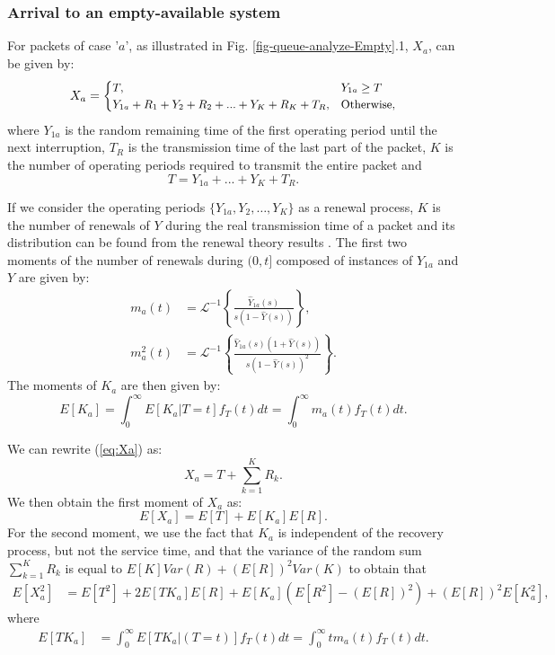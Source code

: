 \documentclass[11pt,journal,oneside,onecolumn,draftclsnofoot]{IEEEtran}
\begin{document}
\subsubsection{Arrival to an empty-available system}
For packets of case '$a$', as illustrated in Fig. \ref{fig-queue-analyze-Empty}.1, $X_a$, can be given by: 
\begin{equation}
\small
X_a=\begin {cases}
T,& Y_{1a}\geq T\\
Y_{1a}+R_1+Y_2+R_2+...+Y_K+R_K+T_R,& \mbox{Otherwise,}
\end{cases}
\label{eq:Xa}
\normalsize
\end{equation}
where $Y_{1a}$ is the random remaining time of the first operating period until the next interruption, $T_R$ is the transmission time of the last part of the packet, $K$ is the number of operating periods required to transmit the entire packet and
\begin{equation}
T=Y_{1a}+...+Y_K+T_R.
\label{eq:renewal-condition}
\end{equation}

If we consider the operating periods $\{Y_{1a},Y_2,\dots,Y_K\}$ as a renewal process, $K$ is the number of renewals of $Y$ during the real transmission time of a packet and  its distribution can be found from the renewal theory results \cite{cox62,ross06}. The first two moments of the number of renewals during $(0,t]$ composed of instances of $Y_{1a}$ and $Y$ are given by:
\begin{align}
m_a(t) & = \mathcal{L}^{-1}\left\{\frac{\widehat{Y}_{1a}(s)}{s(1-\widehat{Y}(s))}\right\}  \label{eq:laplace-of-diff-ma}, \\
m_a^2(t) & = \mathcal{L}^{-1}\left\{\frac{\widehat{Y}_{1a}(s)(1+\widehat{Y}(s))}{s\left(1-\widehat{Y}(s)\right)^2}\right\} \label{eq:laplace-of-diff-m2a}.
\end{align}
The moments of $K_a$ are then given by:
\begin{equation}
E[K_a]=\int_{0}^{\infty}{E[K_a|T=t] f_T(t) dt}=\int_{0}^{\infty}{m_a(t) f_T(t) dt}.
\label{eq:}
\end{equation}
 
We can rewrite (\ref{eq:Xa}) as:
\begin{equation}
X_a=T+\sum_{k=1}^KR_k.
\end{equation}
We then obtain the first moment of $X_a$ as:
\begin{equation}
E[X_a]=E[T]+E[K_a]E[R].
\label{eq:avg-xa}
\end{equation}
For the second moment, we use the fact that $K_a$ is independent of the recovery process, but not the service time, and that the variance of the random sum $\sum_{k=1}^KR_k$ is equal to $E[K]Var(R)+(E[R])^2Var(K)$ to obtain that  
\begin{align}
E[X^2_{a}]&=E[T^2]+2E[TK_a]{E[R]}+E[K_a](E[R^2]-(E[R])^2)+(E[R])^2{E[K_a^2]},
\label{eq:avg-x2a}
\end{align}
where
\begin{align}
E[TK_a]&=\int_{0}^{\infty}{E[TK_a|(T=t)] f_T(t)dt}=\int_{0}^{\infty}{t m_a(t) f_T(t)dt}.
\label{eq:cor-of-T-Ka}
\end{align}
\end{document}
